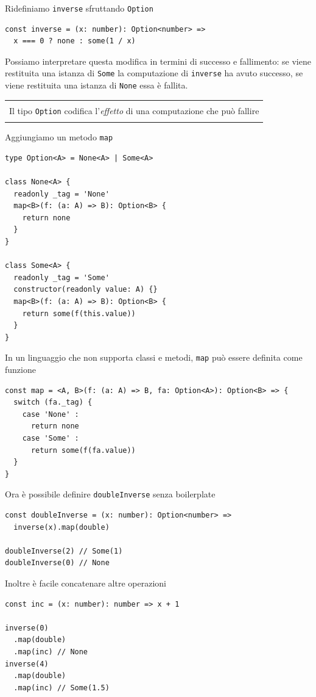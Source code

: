 \documentclass[12pt]{article}
\newenvironment{demo}
    {\begin{center}
    \begin{tabular}{|p{0.9\textwidth}|}
    \hline\\
    }
    {
    \\\\\hline
    \end{tabular}
    \end{center}
    }
\begin{document}
Ridefiniamo \texttt{inverse} sfruttando \texttt{Option}

\begin{verbatim}
const inverse = (x: number): Option<number> =>
  x === 0 ? none : some(1 / x)
\end{verbatim}

Possiamo interpretare questa modifica in termini di successo e fallimento: se viene restituita una istanza di \texttt{Some}
la computazione di \texttt{inverse} ha avuto successo, se viene restituita una istanza di \texttt{None} essa è fallita.

\begin{demo}
Il tipo \texttt{Option} codifica l'\emph{effetto} di una computazione che può fallire
\end{demo}

Aggiungiamo un metodo \texttt{map}

\begin{verbatim}
type Option<A> = None<A> | Some<A>

class None<A> {
  readonly _tag = 'None'
  map<B>(f: (a: A) => B): Option<B> {
    return none
  }
}

class Some<A> {
  readonly _tag = 'Some'
  constructor(readonly value: A) {}
  map<B>(f: (a: A) => B): Option<B> {
    return some(f(this.value))
  }
}
\end{verbatim}

In un linguaggio che non supporta classi e metodi, \texttt{map} può essere definita come funzione

\begin{verbatim}
const map = <A, B>(f: (a: A) => B, fa: Option<A>): Option<B> => {
  switch (fa._tag) {
    case 'None' :
      return none
    case 'Some' :
      return some(f(fa.value))
  }
}
\end{verbatim}


Ora è possibile definire \texttt{doubleInverse} senza boilerplate

\begin{verbatim}
const doubleInverse = (x: number): Option<number> =>
  inverse(x).map(double)

doubleInverse(2) // Some(1)
doubleInverse(0) // None
\end{verbatim}

Inoltre è facile concatenare altre operazioni

\begin{verbatim}
const inc = (x: number): number => x + 1

inverse(0)
  .map(double)
  .map(inc) // None
inverse(4)
  .map(double)
  .map(inc) // Some(1.5)
\end{verbatim}
\end{document}
